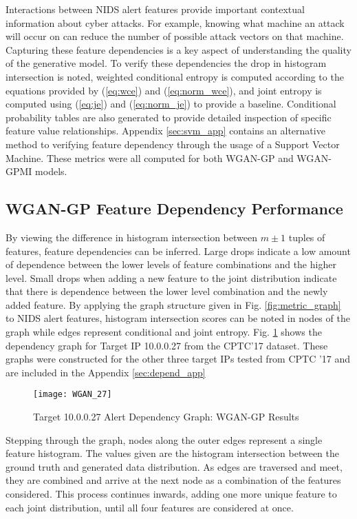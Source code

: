 Interactions between NIDS alert features provide important contextual information about cyber attacks. For example, knowing what machine an attack will occur on can reduce the number of possible attack vectors on that machine. Capturing these feature dependencies is a key aspect of understanding the quality of the generative model. To verify these dependencies the drop in histogram intersection is noted, weighted conditional entropy is computed according to the equations provided by (\ref{eq:wce}) and (\ref{eq:norm_wce}), and joint entropy is computed using (\ref{eq:je}) and (\ref{eq:norm_je}) to provide a baseline. Conditional probability tables are also generated to provide detailed inspection of specific feature value relationships. Appendix \ref{sec:svm_app} contains an alternative method to verifying feature dependency through the usage of a Support Vector Machine. These metrics were all computed for both WGAN-GP and WGAN-GPMI models.

\subsection{WGAN-GP Feature Dependency Performance}

By viewing the difference in histogram intersection between $m\pm1$ tuples of features, feature dependencies can be inferred. Large drops indicate a low amount of dependence between the lower levels of feature combinations and the higher level. Small drops when adding a new feature to the joint distribution indicate that there is dependence between the lower level combination and the newly added feature. By applying the graph structure given in Fig. \ref{fig:metric_graph} to NIDS alert features, histogram intersection scores can be noted in nodes of the graph while edges represent conditional and joint entropy. Fig. \ref{fig:alert_depend_1} shows the dependency graph for Target IP 10.0.0.27 from the CPTC'17 dataset. These graphs were constructed for the other three target IPs tested from CPTC '17 and are included in the Appendix \ref{sec:depend_app}

\begin{figure}[!htbp]
	\centering
	\texttt{[image: WGAN\_27]}
	\caption{
		Target 10.0.0.27 Alert Dependency Graph: WGAN-GP Results
	}
	\label{fig:alert_depend_1}
\end{figure}

Stepping through the graph, nodes along the outer edges represent a single feature histogram. The values given are the histogram intersection between the ground truth and generated data distribution. As edges are traversed and meet, they are combined and arrive at the next node as a combination of the features considered. This process continues inwards, adding one more unique feature to each joint distribution, until all four features are considered at once.

